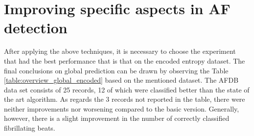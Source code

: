 \section{Improving specific aspects in AF detection}
After applying the above techniques, it is necessary to choose the experiment that had the best performance that is that on the encoded entropy dataset. The final conclusions on global prediction can be drawn by observing the Table \ref{table:overview_global_encoded} based on the mentioned dataset. The AFDB data set consists of 25 records, 12 of which were classified better than the state of the art algorithm. As regards the 3 records not reported in the table, there were neither improvements nor worsening compared to the basic version. Generally, however, there is a slight improvement in the number of correctly classified fibrillating beats.

